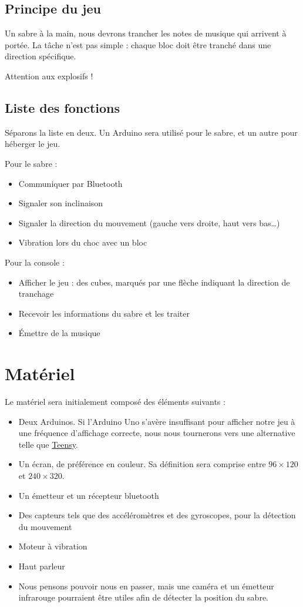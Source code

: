 \documentclass[12pt,twoside]{article}
\begin{document}
\subsection{Principe du jeu}%
\label{sub:principe_du_jeu}

Un sabre à la main, nous devrons trancher les notes de musique qui arrivent à portée. La
tâche n'est pas simple : chaque bloc doit être tranché dans une direction spécifique.

Attention aux explosifs !

\subsection{Liste des fonctions}%
\label{sub:liste_des_fonctions}

Séparons la liste en deux. Un Arduino sera utilisé pour le sabre, et un autre pour
héberger le jeu.

Pour le sabre :
\begin{itemize}
	\item Communiquer par Bluetooth
	\item Signaler son inclinaison
	\item Signaler la direction du mouvement (gauche vers droite, haut vers bas\ldots)
	\item Vibration lors du choc avec un bloc
\end{itemize}
Pour la console :
\begin{itemize}
	\item Afficher le jeu : des cubes, marqués par une flèche indiquant la direction de
		tranchage
	\item Recevoir les informations du sabre et les traiter
	\item Émettre de la musique
\end{itemize}

\section{Matériel}%
\label{sec:materiel}

Le matériel sera initialement composé des éléments suivants :
\begin{itemize}
	\item Deux Arduinos. Si l'Arduino Uno s'avère insuffisant pour afficher notre jeu à
		une fréquence d'affichage correcte, nous nous tournerons vers
		une alternative telle que \href{https://www.pjrc.com/store/teensy40.html}{Teensy}.
	\item Un écran, de préférence en couleur. Sa définition sera comprise entre $96\times
	120$ et $240 \times 320$.
	\item Un émetteur et un récepteur bluetooth
	\item Des capteurs tels que des accéléromètres et des gyroscopes, pour la détection du
		mouvement
	\item Moteur à vibration
	\item Haut parleur
	\item Nous pensons pouvoir nous en passer, mais une caméra et un émetteur infrarouge
		pourraient être utiles afin de détecter la position du sabre.
\end{itemize}
\end{document}
